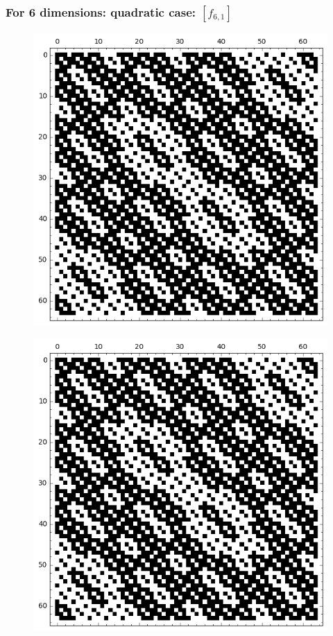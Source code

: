 \documentclass[pdf,sprung,slideColor,nocolorBG]{beamer}
\newenvironment{colortheme}[1]{
\def\ProvidesPackageRCS $##1${\relax}
\renewcommand{\ProcessOptions}{\relax}
\makeatletter

\makeatother
}{}
\begin{document}
\begin{colortheme}{jubata}
\begin{frame}
\begin{figure}
\begin{minipage}{.48\textwidth}
  \label{fig:q4_1_bent_cayley_graph_index_matrix}
\end{minipage}
\end{figure}
\end{frame}
\begin{frame}
\frametitle{For 6 dimensions: quadratic case: $[f_{6,1}]$}
\begin{figure}
\centering
\begin{minipage}{.48\textwidth}
  \centering
  \includegraphics[width=.9\linewidth]{../matrix_plot/c6_1_weight_class_matrix.png}
  \label{fig:q6_1_weight_class_matrix}
\end{minipage}%
\begin{minipage}{.48\textwidth}
  \centering
  \includegraphics[width=.9\linewidth]{../matrix_plot/c6_1_bent_cayley_graph_index_matrix.png}

\end{minipage}
\end{figure}
\end{frame}
\end{colortheme}
\end{document}
